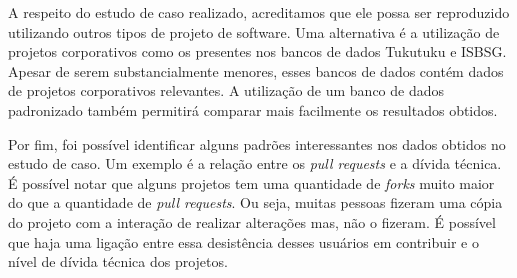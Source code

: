 A respeito do estudo de caso realizado, acreditamos que ele possa ser reproduzido utilizando outros tipos de projeto de software. Uma alternativa é a utilização de projetos corporativos como os presentes nos bancos de dados Tukutuku\cite{mendes2008cross} e ISBSG\cite{fernandez2014potential}. Apesar de serem substancialmente menores, esses bancos de dados contém dados de projetos  corporativos relevantes. A utilização de um banco de dados padronizado também permitirá comparar mais facilmente os resultados obtidos.

 Por fim, foi possível identificar alguns padrões interessantes nos dados obtidos no estudo de caso. Um exemplo é a relação entre os \textit{pull requests} e a dívida técnica. É possível notar que alguns projetos tem uma quantidade de \textit{forks} muito maior do que a quantidade de \textit{pull requests}. Ou seja, muitas pessoas fizeram uma cópia do projeto com a interação de realizar alterações mas, não o fizeram. É possível que haja uma ligação entre essa desistência desses usuários em contribuir e o nível de dívida técnica dos projetos.





